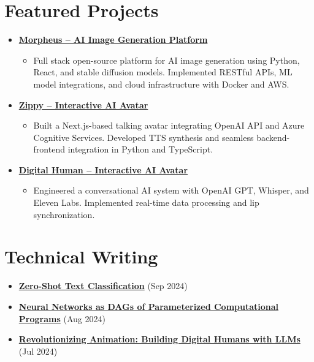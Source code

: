 \documentclass[letterpaper,11pt]{article}
\newcommand{\normalfaExternalLink}{{\mdseries\faExternalLink}}
\begin{document}
\section{Featured Projects}
\begin{itemize}[leftmargin=*, itemsep=1pt]
    \item \textbf{\href{https://github.com/Monadical-SAS/Morpheus}{Morpheus -- AI Image Generation Platform \normalfaExternalLink}}
    \begin{itemize}[itemsep=0pt]
        \item Full stack open-source platform for AI image generation using Python, React, and stable diffusion models. Implemented RESTful APIs, ML model integrations, and cloud infrastructure with Docker and AWS.
    \end{itemize}
    \item \textbf{\href{https://github.com/asanchezyali/ai-avatar}{Zippy -- Interactive AI Avatar \normalfaExternalLink}}
    \begin{itemize}[itemsep=0pt]
        \item Built a Next.js-based talking avatar integrating OpenAI API and Azure Cognitive Services. Developed TTS synthesis and seamless backend-frontend integration in Python and TypeScript.
    \end{itemize}
    \item \textbf{\href{https://github.com/asanchezyali/talking-avatar-with-ai}{Digital Human -- Interactive AI Avatar \normalfaExternalLink}}
    \begin{itemize}[itemsep=0pt]
        \item Engineered a conversational AI system with OpenAI GPT, Whisper, and Eleven Labs. Implemented real-time data processing and lip synchronization.
    \end{itemize}
\end{itemize}

\section{Technical Writing}
\begin{itemize}[leftmargin=*, itemsep=0pt]
    \item \textbf{\href{https://www.asanchezyali.com/blog/en/ai/20240917ZeroShot}{Zero-Shot Text Classification}} (Sep 2024)
    \item \textbf{\href{https://www.asanchezyali.com/blog/en/differentiable-programming/20240923DifferentiablePrograms}{Neural Networks as DAGs of Parameterized Computational Programs}} (Aug 2024)
    \item \textbf{\href{https://www.asanchezyali.com/blog/ai-avatars/20240703DigitalHuman}{Revolutionizing Animation: Building Digital Humans with LLMs}} (Jul 2024)
\end{itemize}
\end{document}
